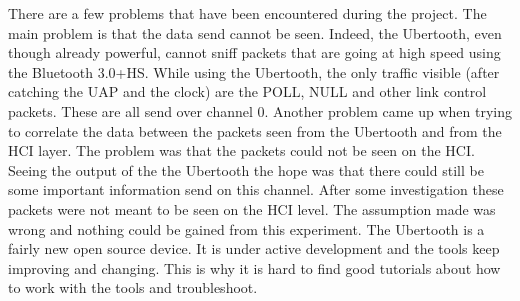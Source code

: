 \label{subsec:problems}
There are a few problems that have been encountered during the project. 
The main problem is that the data send cannot be seen. Indeed, the Ubertooth, even though already powerful, cannot sniff packets that are going at high speed using the Bluetooth 3.0+HS. \pend
While using the Ubertooth, the only traffic visible (after catching the UAP and the clock) are the POLL, NULL and other link control packets. These are all send over channel 0.\pend
Another problem came up when trying to correlate the data between the packets seen from the Ubertooth and from the HCI layer. The problem was that the packets could not be seen on the HCI. Seeing the output of the the Ubertooth the hope was that there could still be some important information send on this channel. After some investigation these packets were not meant to be seen on the HCI level. The assumption made was wrong and nothing could be gained from this experiment. \pend
The Ubertooth is a fairly new open source device. It is under active development and the tools keep improving and changing. This is why it is hard to find good tutorials about how to work with the tools and troubleshoot.